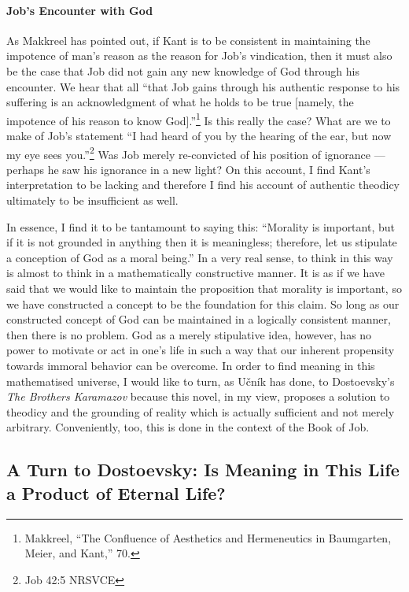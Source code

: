 \documentclass[12pt]{article}
\begin{document}
	\paragraph*{Job's Encounter with God} As Makkreel has pointed out, if Kant is to be consistent in maintaining the impotence of man's reason as the reason for Job's vindication, then it must also be the case that Job did not gain any new knowledge of God through his encounter. We hear that all ``that Job gains through his authentic response to his suffering is an acknowledgment of what he holds to be true [namely, the impotence of his reason to know God].''\footnote{Makkreel, ``The Confluence of Aesthetics and Hermeneutics in Baumgarten, Meier, and Kant,'' 70.} Is this really the case? What are we to make of Job's statement ``I had heard of you by the hearing of the ear, but now my eye sees you.''\footnote{Job 42:5 NRSVCE} Was Job merely re-convicted of his position of ignorance --- perhaps he saw his ignorance in a new light? On this account, I find Kant's interpretation to be lacking and therefore I find his account of authentic theodicy ultimately to be insufficient as well. 
	
	In essence, I find it to be tantamount to saying this: ``Morality is important, but if it is not grounded in anything then it is meaningless; therefore, let us stipulate a conception of God as a moral being.'' In a very real sense, to think in this way is almost to think in a mathematically constructive manner. It is as if we have said that we would like to maintain the proposition that morality is important, so we have constructed a concept to be the foundation for this claim. So long as our constructed concept of God can be maintained in a logically consistent manner, then there is no problem. God as a merely stipulative idea, however, has no power to motivate or act in one's life in such a way that our inherent propensity towards immoral behavior can be overcome. In order to find meaning in this mathematised universe, I would like to turn, as U\v{c}n\'{i}k has done, to Dostoevsky's \emph{The Brothers Karamazov} because this novel, in my view, proposes a solution to theodicy and the grounding of reality which is actually sufficient and not merely arbitrary. Conveniently, too, this is done in the context of the Book of Job. 
	
	\subsection*{A Turn to Dostoevsky: Is Meaning in This Life a Product of Eternal Life?}
	
\end{document}
